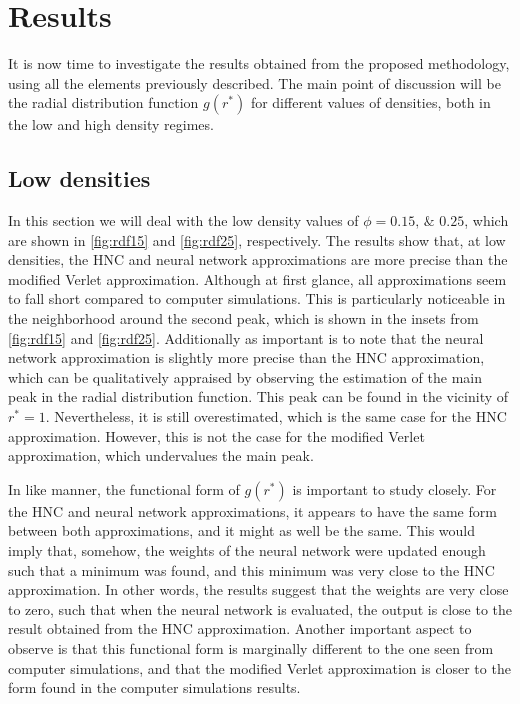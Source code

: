 \section{Results}
It is now time to investigate the results obtained from the proposed methodology, using all the elements previously described.
The main point of discussion will be the radial distribution
function \textemdash $g(r^*)$ \textemdash for different values of densities, both in the
low and high density regimes.

\subsection{Low densities}
In this section we will deal with the low 
density values of $\phi=\numlist[list-pair-separator={\enspace\text{and}\enspace}]{0.15;0.25}$, which are shown in \autoref{fig:rdf15} and \autoref{fig:rdf25}, respectively.
The results show that, at low densities, the HNC and neural network approximations are
more precise than the modified Verlet approximation. Although at first glance, all
approximations seem to fall short compared to computer simulations. This is particularly 
noticeable in the neighborhood around the second peak, which is shown in the insets 
from \autoref{fig:rdf15} and \autoref{fig:rdf25}.
Additionally as important is to note that the neural network approximation is slightly
more precise than the HNC approximation, which can be qualitatively appraised by observing 
the estimation of the main peak in the radial distribution function. This peak can be found 
in the vicinity of $r^* = 1$. Nevertheless, it is still overestimated, which is the 
same case for the HNC approximation. However, this is not the case for the modified Verlet 
approximation, which undervalues the main peak.

In like manner, the functional form of $g(r^*)$ is important to study closely.
For the HNC and neural network approximations, it appears to have the same form between 
both approximations, and it might as well be the same.
This would imply that, somehow, the weights of the neural network
were updated enough such that a minimum was found, and this minimum was very close to the
HNC approximation. In other words, the results suggest that the weights are very close to
zero, such that when the neural network is evaluated, the output is close to the
result obtained from the HNC approximation.
Another important aspect to observe is that this functional form is marginally different
to the one seen from computer simulations, and that the modified Verlet approximation is 
closer to the form found in the computer simulations results.

